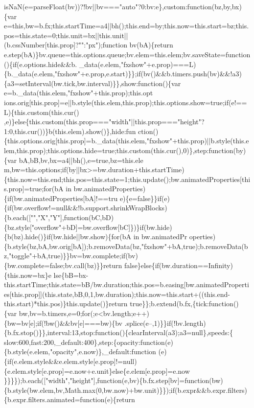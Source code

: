 \begin{DoxyCode}
{       isNaN(e=parseFloat(bv))?!bv||bv==="auto"?0:bv:e\},custom:function(bz,by,bx)\{var
       e=this,bw=b.fx;this.startTime=a4||bh();this.end=by;this.now=this.start=bz;this.pos=this.state=0;this.unit=bx||this.unit||(b.cssNumber[this.prop]?"":"px");function
       bv(bA)\{return
       e.step(bA)\}bv.queue=this.options.queue;bv.elem=this.elem;bv.saveState=function()\{if(e.options.hide&&b.
      \_data(e.elem,"fxshow"+e.prop)===L)\{b.\_data(e.elem,"fxshow"+e.prop,e.start)\}\};if(bv()&&b.timers.push(bv)&&!a3)\{a3=setInterval(bw.tick,bw.interval)\}\},show:function()\{var
       e=b.\_data(this.elem,"fxshow"+this.prop);this.opt
      ions.orig[this.prop]=e||b.style(this.elem,this.prop);this.options.show=true;if(e!==L)\{this.custom(this.cur()
      ,e)\}else\{this.custom(this.prop==="width"||this.prop==="height"?1:0,this.cur())\}b(this.elem).show()\},hide:fun
      ction()\{this.options.orig[this.prop]=b.\_data(this.elem,"fxshow"+this.prop)||b.style(this.elem,this.prop);this.options.hide=true;this.custom(this.cur(),0)\},step:function(by)\{var
       bA,bB,bv,bx=a4||bh(),e=true,bz=this.ele
      m,bw=this.options;if(by||bx>=bw.duration+this.startTime)\{this.now=this.end;this.pos=this.state=1;this.update();bw.animatedProperties[this.prop]=true;for(bA in
       bw.animatedProperties)\{if(bw.animatedProperties[bA]!==tru
      e)\{e=false\}\}if(e)\{if(bw.overflow!=null&&!b.support.shrinkWrapBlocks)\{b.each(["","X","Y"],function(bC,bD)\{bz.style["overflow"+bD]=bw.overflow[bC]\})\}if(bw.hide)\{b(bz).hide()\}if(bw.hide||bw.show)\{for(bA in
       bw.animatedPr
      operties)\{b.style(bz,bA,bw.orig[bA]);b.removeData(bz,"fxshow"+bA,true);b.removeData(bz,"toggle"+bA,true)\}\}bv=bw.complete;if(bv)\{bw.complete=false;bv.call(bz)\}\}return
       false\}else\{if(bw.duration==Infinity)\{this.now=bx\}e
      lse\{bB=bx-this.startTime;this.state=bB/bw.duration;this.pos=b.easing[bw.animatedProperties[this.prop]](this.state,bB,0,1,bw.duration);this.now=this.start+((this.end-this.start)*this.pos)\}this.update()\}return
       true\}\};b.extend(b.fx,\{tick:function()\{var
       bw,bv=b.timers,e=0;for(;e<bv.length;e++)\{bw=bv[e];if(!bw()&&bv[e]===bw)\{bv
      .splice(e--,1)\}\}if(!bv.length)\{b.fx.stop()\}\},interval:13,stop:function()\{clearInterval(a3);a3=null\},speeds:\{
      slow:600,fast:200,\_default:400\},step:\{opacity:function(e)\{b.style(e.elem,"opacity",e.now)\},\_default:function
      (e)\{if(e.elem.style&&e.elem.style[e.prop]!=null)\{e.elem.style[e.prop]=e.now+e.unit\}else\{e.elem[e.prop]=e.now
      \}\}\}\});b.each(["width","height"],function(e,bv)\{b.fx.step[bv]=function(bw)\{b.style(bw.elem,bv,Math.max(0,bw.now)+bw.unit)\}\});if(b.expr&&b.expr.filters)\{b.expr.filters.animated=function(e)\{return
}
\end{DoxyCode}
